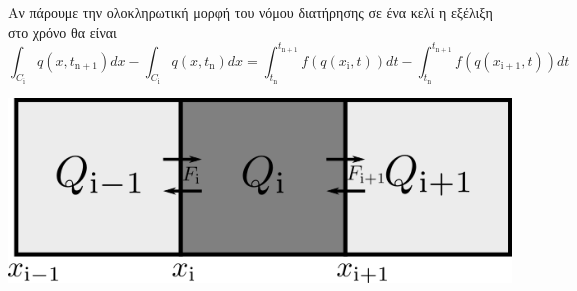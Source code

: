 Αν πάρουμε την ολοκληρωτική μορφή του νόμου διατήρησης σε ένα κελί η εξέλιξη στο χρόνο θα είναι
\begin{equation}
\int _{C_\mathrm{i}} q(x,t_\mathrm{n+1})dx -\int _{C_\mathrm{i}} q(x,t_\mathrm{n})dx = 
\int_{t_\mathrm{n}}^{t_\mathrm{n+1}} f(q(x_\mathrm{i},t))dt - \int_{t_\mathrm{n}}^{t_\mathrm{n+1}} f(q(x_\mathrm{i+1},t))dt
\end{equation}

\begin{marginfigure}
	\centering
	\includegraphics[width=1\linewidth]{Images/FVM}
	\caption{}
	\label{fig:fvm}
\end{marginfigure}


